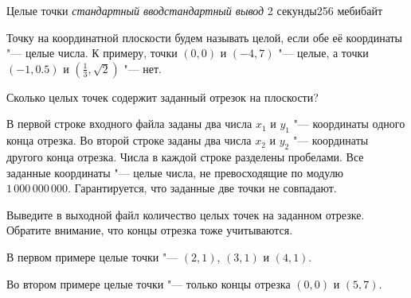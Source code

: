 
\gdef\thisproblemauthor{Иван Казменко}
\begin{problem}{Целые точки}
{\textsl{стандартный ввод}}{\textsl{стандартный вывод}}
{2 секунды}{256 мебибайт}{}

Точку на координатной плоскости будем называть целой,
если обе её координаты "--- целые числа.
К примеру, точки $(0, 0)$ и $(-4, 7)$ "--- целые,
а точки $(-1, 0.5)$ и $(\frac{1}{3}, \sqrt{2})$ "--- нет.

Сколько целых точек содержит заданный отрезок на плоскости?

\InputFile

В первой строке входного файла заданы два числа $x_1$ и $y_1$ "---
координаты одного конца отрезка.
Во второй строке заданы два числа $x_2$ и $y_2$ "---
координаты другого конца отрезка.
Числа в каждой строке разделены пробелами.
Все заданные координаты "--- целые числа, не превосходящие по модулю
$1\,000\,000\,000$.
Гарантируется, что заданные две точки не совпадают.

\OutputFile

Выведите в выходной файл количество целых точек на заданном отрезке.
Обратите внимание, что концы отрезка тоже учитываются.

\Examples

\begin{example}%
%
%
\end{example}

\Explanations

В первом примере целые точки "--- $(2, 1)$, $(3, 1)$ и $(4, 1)$.

Во втором примере целые точки "--- только концы отрезка $(0, 0)$ и $(5, 7)$.

\end{problem}
